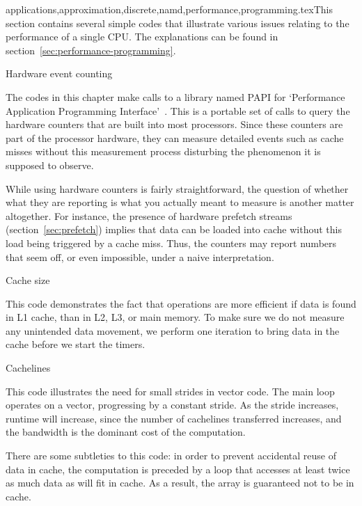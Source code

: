 {applications,approximation,discrete,namd,performance,programming}.texThis section contains several simple codes that illustrate various
issues relating to the performance of a single CPU. The explanations
can be found in section~\ref{sec:performance-programming}.

 {Hardware event counting}
\label{sec:papi}

The codes in this chapter make calls to a library named PAPI for
`Performance Application Programming
Interface'~\cite{papi,papi-homepage}. This is a portable set of calls
to query the hardware counters that are built into most
processors. Since these counters are part of the processor hardware,
they can measure detailed events such as cache misses without this
measurement process disturbing the phenomenon it is supposed to
observe.

While using hardware counters is fairly straightforward, the question
of whether what they are reporting is what you actually meant to
measure is another matter altogether. For instance, the presence of
hardware prefetch streams (section~\ref{sec:prefetch}) implies that
data can be loaded into cache without this load being triggered by a
cache miss. Thus, the counters may report numbers that seem off, or
even impossible, under a naive interpretation.

 {Cache size}
\label{sec:cachesize-code}

This code demonstrates the fact that operations are more efficient if
data is found in L1 cache, than in L2, L3, or main memory. To make
sure we do not measure any unintended data movement, we perform one
iteration to bring data in the cache before we start the timers.

\begingroup\small

\endgroup

 {Cachelines}
\label{sec:cacheline-code}

This code illustrates the need for small strides in vector code. The
main loop operates on a vector, progressing by a constant stride. As
the stride increases, runtime will increase, since the number of
cachelines transferred increases, and the bandwidth is the dominant
cost of the computation.

There are some subtleties to this code: in order to prevent accidental
reuse of data in cache, the computation is preceded by a loop that
accesses at least twice as much data as will fit in cache. As a
result, the array is guaranteed not to be in cache.

\begingroup\small

\endgroup

